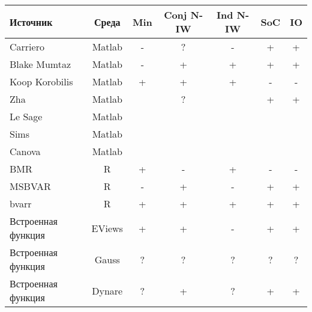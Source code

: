 \documentclass[11pt]{article} %
\begin{document}
\begin{center}
\begin{tabular}{p{4cm}cccccc}
\toprule
Источник&  Среда&Min &  Conj N-IW & Ind N-IW & SoC &IO\\
\midrule
Carriero&Matlab&-&?&-&+&+ \\
Blake Mumtaz&Matlab&-&+&+&+&+ \\
Koop Korobilis&Matlab  & + & +  & + &- &- \\
Zha&Matlab&&?&&+&+\\
Le Sage&Matlab&&&&&\\
Sims&Matlab&&&&&\\
Canova&Matlab&&&&&\\
BMR&R& + & - & + & - & -  \\
MSBVAR&R & - & + & - & + & +  \\
bvarr&R  & + & + & + & + & +  \\
Встроенная функция&EViews& + & + & - &+ &+ \\
Встроенная функция&Gauss& ? & ?& ?& ?&?  \\
Встроенная функция&Dynare& ? & +& ?& +&+  \\
\bottomrule
\end{tabular}
\end{center}
\end{document}
